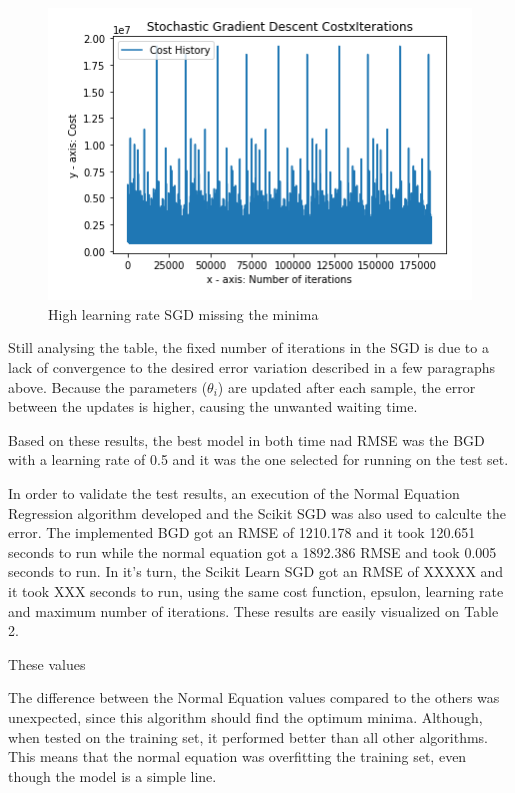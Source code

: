 \documentclass[conference]{IEEEtran}
\begin{document}
	  \begin{figure}[!h]
      \centering
      \includegraphics[width=1\columnwidth]{images/sgd_high_learning_rate.png}
      \caption{High learning rate SGD missing the minima}
      \label{fig3}
  \end{figure}
	
	Still analysing the table, the fixed number of iterations in the SGD is due to a lack of convergence to the desired error variation described in a few paragraphs above. Because the parameters ($\theta_i$) are updated after each sample, the error between the updates is higher, causing the unwanted waiting time.
	
	Based on these results, the best model in both time nad RMSE was the BGD with a learning rate of 0.5 and it was the one selected for running on the test set.

	In order to validate the test results, an execution of the Normal Equation Regression algorithm developed and the Scikit SGD was also used to calculte the error. The  implemented BGD got an RMSE of 1210.178 and it took 120.651 seconds to run while the normal equation got a 1892.386 RMSE and took 0.005 seconds to run. In it's turn, the Scikit Learn SGD got an RMSE of XXXXX and it took XXX seconds to run, using the same cost function, epsulon, learning rate and maximum number of iterations. These results are easily visualized on Table 2.
	
	These values
	
	The difference between the Normal Equation values compared to the others was unexpected, since this algorithm should find the optimum minima. Although, when tested on the training set, it performed better than all other algorithms. This means that the normal equation was overfitting the training set, even though the model is a simple line.
	
\end{document}

